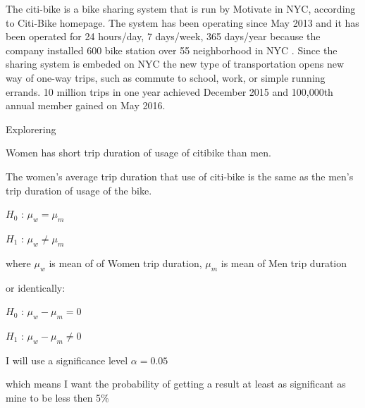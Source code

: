 The citi-bike is a bike sharing system that is run by Motivate in NYC, according to Citi-Bike homepage\cite{nyc}. The system has been operating since May 2013 and it has been operated for 24 hours/day, 7 days/week, 365 days/year because the company installed 600 bike station over 55 neighborhood in NYC \cite{nyc}. Since the sharing system is embeded on NYC the new type of transportation opens new way of one-way trips, such as commute to school, work, or simple running errands. 10 million trips in one year achieved December 2015 and 100,000th annual member gained on May 2016\cite{nyc}.

Explorering 

Women has short trip duration of usage of citibike than men.

The women's average trip duration that use of citi-bike is the same as the men's trip duration of usage of the bike.


$H_0$ : $\mu_w  = \mu_m $ 

$H_1$ : $\mu_w  \neq \mu_m $ 

where $\mu_w$ is mean of of Women trip duration, $\mu_m$ is mean of Men trip duration

or identically:

$H_0$ : $\mu_w - \mu_m   = 0 $

$H_1$ : $\mu_w  - \mu_m   \neq 0 $

 I will use a significance level  $\alpha=0.05$

which means I want the probability of getting a result at least as significant as mine to be less then 5\%




